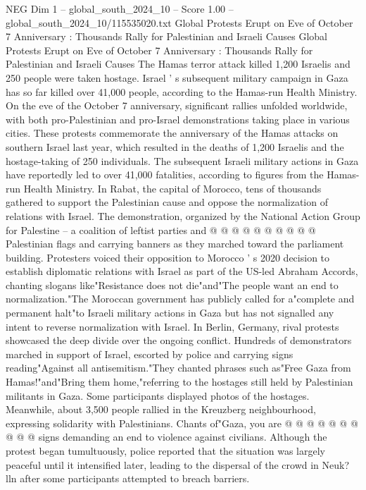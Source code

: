 \begin{textsample}{NEG Dim 1 – global\_south\_2024\_10 – Score 1.00 – global\_south\_2024\_10/115535020.txt}  \label{ex:f1_neg_433}
Global Protests Erupt on Eve of October 7 Anniversary : Thousands Rally for Palestinian and Israeli Causes Global Protests Erupt on Eve of October 7 Anniversary : Thousands Rally for Palestinian and Israeli Causes The Hamas terror attack killed 1,200 Israelis and 250 people were taken hostage.
Israel ' s subsequent military campaign in Gaza has so far killed over 41,000 people, according to the Hamas-run Health Ministry.
On the eve of the October 7 anniversary, significant rallies unfolded worldwide, with both pro-Palestinian and pro-Israel demonstrations taking place in various cities.
These protests commemorate the anniversary of the Hamas attacks on southern Israel last year, which resulted in the deaths of 1,200 Israelis and the hostage-taking of 250 individuals.
The subsequent Israeli military actions in Gaza have reportedly led to over 41,000 fatalities, according to figures from the Hamas-run Health Ministry.
In Rabat, the capital of Morocco, tens of thousands gathered to support the Palestinian cause and oppose the normalization of relations with Israel.
The demonstration, organized by the National Action Group for Palestine -- a coalition of leftist parties and @ @ @ @ @ @ @ @ @ @ Palestinian flags and carrying banners as they marched toward the parliament building.
Protesters voiced their opposition to Morocco ' s 2020 decision to establish diplomatic relations with Israel as part of the US-led Abraham Accords, chanting slogans like"Resistance does not die"and"The people want an end to normalization."The Moroccan government has publicly called for a"complete and permanent halt"to Israeli military actions in Gaza but has not signalled any intent to reverse normalization with Israel.
In Berlin, Germany, rival protests showcased the deep divide over the ongoing conflict.
Hundreds of demonstrators marched in support of Israel, escorted by police and carrying signs reading"Against all antisemitism."They chanted phrases such as"Free Gaza from Hamas!"and"Bring them home,"referring to the hostages still held by Palestinian militants in Gaza.
Some participants displayed photos of the hostages.
Meanwhile, about 3,500 people rallied in the Kreuzberg neighbourhood, expressing solidarity with Palestinians.
Chants of"Gaza, you are @ @ @ @ @ @ @ @ @ @ signs demanding an end to violence against civilians.
Although the protest began tumultuously, police reported that the situation was largely peaceful until it intensified later, leading to the dispersal of the crowd in Neuk? lln after some participants attempted to breach barriers.

\end{textsample}
